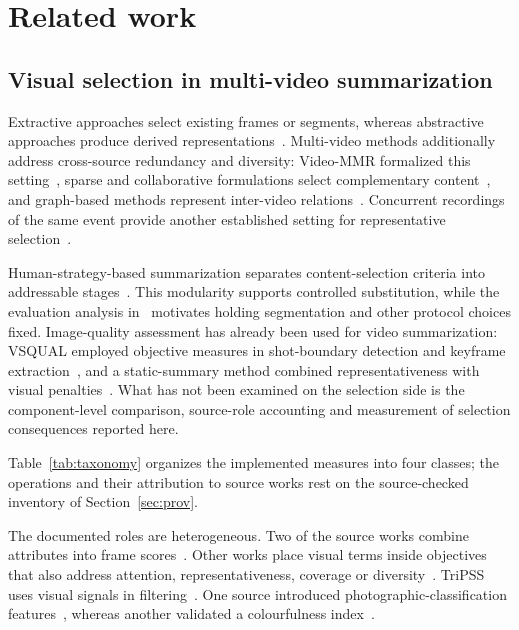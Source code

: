 \section{Related work}\label{sec:related}


\subsection{Visual selection in multi-video summarization}

Extractive approaches select existing frames or segments, whereas abstractive approaches produce derived representations~\citep{apostolidis2021survey,truong2007video_abstraction}. Multi-video methods additionally address cross-source redundancy and diversity: Video-MMR formalized this setting~\citep{li2010videommr}, sparse and collaborative formulations select complementary content~\citep{panda2017collaborative,panda2017diversity}, and graph-based methods represent inter-video relations~\citep{wu2020mvsgcn}. Concurrent recordings of the same event provide another established setting for representative selection~\citep{bano2016vicomp,cricri2014multimodal}. 

Human-strategy-based summarization separates content-selection criteria into addressable stages~\citep{barbieri2021tese,barbieri2021content}. This modularity supports controlled substitution, while the evaluation analysis in~\citep{otani2019rethinking} motivates holding segmentation and other protocol choices fixed. Image-quality assessment has already been used for video summarization: VSQUAL employed objective measures in shot-boundary detection and keyframe extraction~\citep{cirne2014vsqual}, and a static-summary method combined representativeness with visual penalties~\citep{jeong2016static}. What has not been examined on the selection side is the component-level comparison, source-role accounting and measurement of selection consequences reported here.

Table~\ref{tab:taxonomy} organizes the implemented measures into four classes; the operations and their attribution to source works rest on the source-checked inventory of Section~\ref{sec:prov}.



The documented roles are heterogeneous. Two of the source works combine attributes into frame scores~\citep{srinivas2016rank,korolkov2025keyframe}. Other works place visual terms inside objectives that also address attention, representativeness, coverage or diversity~\citep{gygli2014summe,huang2024aesthetic,jeong2016static,qaroush2025diversity,yang2024keyframe,xu2024property}. TriPSS uses visual signals in filtering~\citep{cakmak2025tripss}. One source introduced photographic-classification features~\citep{ke2006highlevel}, whereas another validated a colourfulness index~\citep{hasler2003colorfulness}. 

